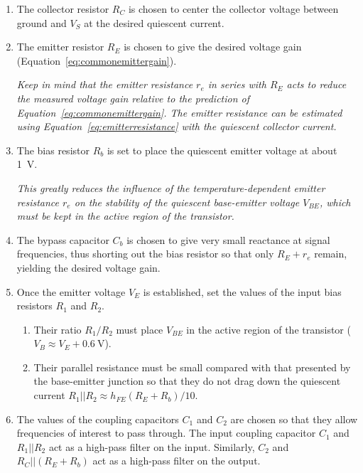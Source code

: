 \documentclass[11pt]{article}
\begin{document}
\begin{enumerate}
\item The collector resistor $R_C$ is chosen to center the collector
  voltage between ground and $V_S$ at the desired quiescent current.

\item The emitter resistor $R_E$ is chosen to give the desired voltage
  gain (Equation~\ref{eq:commonemittergain}).

  \emph{Keep in mind that the emitter resistance $r_e$ in series with
    $R_E$ acts to reduce the measured voltage gain relative to the
    prediction of Equation~\ref{eq:commonemittergain}. The emitter
    resistance can be estimated using
    Equation~\ref{eq:emitterresistance} with the quiescent collector
    current.}

\item The bias resistor $R_b$ is set to place the quiescent emitter
  voltage at about 1~V.

  \emph{This greatly reduces the influence of the
    temperature-dependent emitter resistance $r_e$ on the stability of
    the quiescent base-emitter voltage $V_{BE}$, which must be kept in
    the active region of the transistor.}

\item The bypass capacitor $C_b$ is chosen to give very small
  reactance at signal frequencies, thus shorting out the bias resistor
  so that only $R_E + r_e$ remain, yielding the desired voltage gain.

\item Once the emitter voltage $V_E$ is established, set the values of
  the input bias resistors $R_1$ and $R_2$.
  \begin{enumerate}
  \item Their ratio $R_1/R_2$ must place $V_{BE}$ in the active region
    of the transistor ($V_B \approx V_E + 0.6~\mathrm{V}$).

  \item Their parallel resistance must be small compared with that
    presented by the base-emitter junction so that they do not drag 
    down the quiescent current
    $R_1 || R_2 \approx h_{FE} (R_E + R_b)/10$.
  \end{enumerate}

\item The values of the coupling capacitors $C_1$ and $C_2$ are chosen
  so that they allow frequencies of interest to pass through. The
  input coupling capacitor $C_1$ and $R_1||R_2$ act as a
  high-pass filter on the input. Similarly, $C_2$ and $R_C||(R_E +
  R_b)$ act as a high-pass filter on the output. 
\end{enumerate}
\end{document}
